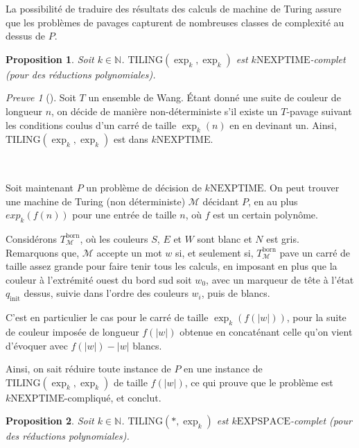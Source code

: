 \documentclass{scrartcl}
\newcommand{\N}{\mathbb N}
\newtheorem{proposition}{Proposition}
\theoremstyle{definition}
\theoremstyle{remark}
\newtheorem*{preuve}{Preuve}
\begin{document}
La possibilité de traduire des résultats des calculs de machine de Turing assure que les problèmes de pavages capturent de nombreuses classes de complexité au dessus de $P$.

\begin{proposition}
  Soit $k\in\N$. $\mathrm{TILING}(\exp_k,\exp_k)$ est $k\mathrm{NEXPTIME}$-complet (pour des réductions polynomiales).
\end{proposition}

\begin{preuve}[]
  Soit $T$ un ensemble de Wang. Étant donné une suite de couleur de longueur $n$, on décide de manière non-déterministe s'il existe un $T$-pavage suivant les conditions coulus d'un carré de taille $\exp_k(n)$ en en devinant un. Ainsi, $\mathrm{TILING}(\exp_k,\exp_k)$ est dans $k\mathrm{NEXPTIME}$.

  \

  Soit maintenant $P$ un problème de décision de $k\mathrm{NEXPTIME}$. On peut trouver une machine de Turing (non déterministe) $\mathcal M$ décidant $P$, en au plus $exp_k(f(n))$ pour une entrée de taille $n$, où $f$ est un certain polynôme.

  Considérons $T^\mathrm{born}_{\mathcal M}$, où les couleurs $S$, $E$ et $W$ sont blanc et $N$ est gris. Remarquons que, $\mathcal M$ accepte un mot $w$ si, et seulement si, $T^\mathrm{born}_\mathcal M$ pave un carré de taille assez grande pour faire tenir tous les calculs, en imposant en plus que la couleur à l'extrémité ouest du bord sud soit $w_0$, avec un marqueur de tête à l'état $q_\mathrm{init}$ dessus, suivie dans l'ordre des couleurs $w_i$, puis de blancs.

  C'est en particulier le cas pour le carré de taille $\exp_k(f(|w|))$, pour la suite de couleur imposée de longueur $f(|w|)$ obtenue en concaténant celle qu'on vient d'évoquer avec $f(|w|)-|w|$ blancs.

  Ainsi, on sait réduire toute instance de $P$ en une instance de $\mathrm{TILING}(\exp_k,\exp_k)$ de taille $f(|w|)$, ce qui prouve que le problème est $k\mathrm{NEXPTIME}$-compliqué, et conclut.
\end{preuve}

\begin{proposition}
  Soit $k\in\N$. $\mathrm{TILING}(*,\exp_k)$ est $k\mathrm{EXPSPACE}$-complet (pour des réductions polynomiales).
\end{proposition}
\end{document}
